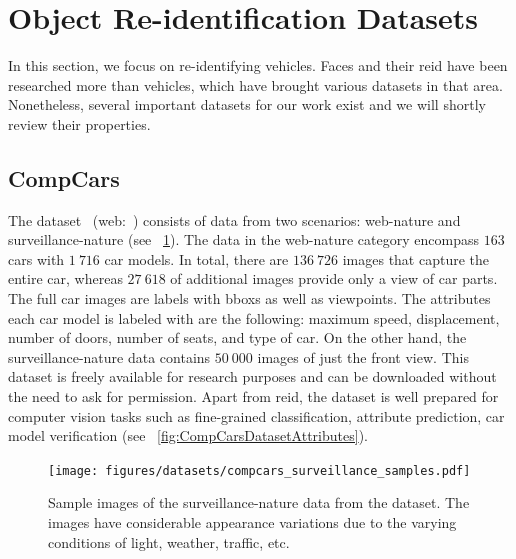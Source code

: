 \section{Object Re-identification Datasets}
\label{sec:ObjectReIDDatasets}

In this section, we focus on re-identifying vehicles. Faces and their \gls{reid} have been researched more than vehicles, which have brought various datasets in that area. Nonetheless, several important datasets for our work exist and we will shortly review their properties.

\subsection{CompCars}
\label{ssec:DatasetCompCars}

The  dataset~\cite{yang2015compcars} (web:~\cite{webcompcarsdataset}) consists of data from two scenarios: web-nature and surveillance-nature (see \figstr{}~\ref{fig:CompCarsDatasetSurveillance}). The data in the web-nature category encompass $163$ cars with $1\ 716$ car models. In total, there are $136\ 726$ images that capture the entire car, whereas $27\ 618$ of additional images provide only a view of car parts. The full car images are labels with \glspl{bbox} as well as viewpoints. The attributes each car model is labeled with are the following: maximum speed, displacement, number of doors, number of seats, and type of car. On the other hand, the surveillance-nature data contains $50\ 000$ images of just the front view. This dataset is freely available for research purposes and can be downloaded without the need to ask for permission. Apart from \gls{reid}, the dataset is well prepared for computer vision tasks such as fine-grained classification, attribute prediction, car model verification (see \figstr{}~\ref{fig:CompCarsDatasetAttributes}).

\begin{figure}[t]
    \centerline{\texttt{[image: figures/datasets/compcars\_surveillance\_samples.pdf]}}
    \caption[ dataset]{Sample images of the surveillance-nature data from the  dataset. The images have considerable appearance variations due to the varying conditions of light, weather, traffic, etc. }
    \label{fig:CompCarsDatasetSurveillance}
\end{figure}

